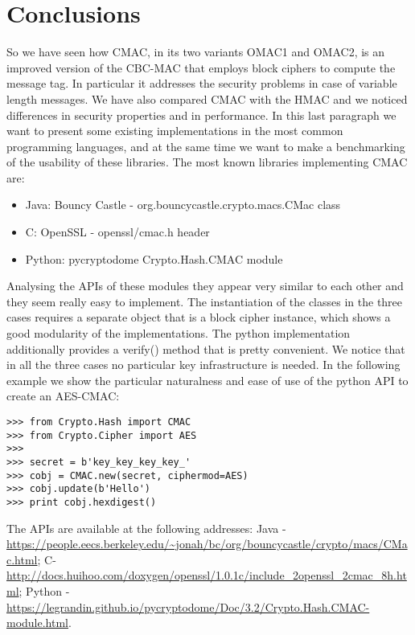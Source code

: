 \documentclass[11pt]{article}
\begin{document}
\section{Conclusions}
So we have seen how CMAC, in its two variants OMAC1 and OMAC2, is an improved version of the CBC-MAC that employs block ciphers to compute the message tag. In particular it addresses the security problems in case of variable length messages. We have also compared CMAC with the HMAC and we noticed differences in security properties and in performance.
In this last paragraph we want to present some existing implementations in the most common programming languages, and at the same time we want to make a benchmarking of the usability of these libraries.
The most known libraries implementing CMAC are:
\begin{itemize}
\item Java: Bouncy Castle - org.bouncycastle.crypto.macs.CMac class
\item C: OpenSSL - openssl/cmac.h header
\item Python: pycryptodome Crypto.Hash.CMAC module
\end{itemize}
Analysing the APIs of these modules they appear very similar to each other and they seem really easy to implement. The instantiation of the classes in the three cases requires a separate object that is a block cipher instance, which shows a good modularity of the implementations. The python implementation additionally provides a verify() method that is pretty convenient. We notice that in all the three cases no particular key infrastructure is needed. In the following example we show the particular naturalness and ease of use of the python API to create an AES-CMAC:

\begin{verbatim}
>>> from Crypto.Hash import CMAC
>>> from Crypto.Cipher import AES
>>>
>>> secret = b'key_key_key_key_'
>>> cobj = CMAC.new(secret, ciphermod=AES)
>>> cobj.update(b'Hello')
>>> print cobj.hexdigest()
\end{verbatim}

The APIs are available at the following addresses: Java - \url{https://people.eecs.berkeley.edu/~jonah/bc/org/bouncycastle/crypto/macs/CMac.html}; C- \url{http://docs.huihoo.com/doxygen/openssl/1.0.1c/include_2openssl_2cmac_8h.html}; Python - \url{https://legrandin.github.io/pycryptodome/Doc/3.2/Crypto.Hash.CMAC-module.html}.


\nocite{*} %
 

\end{document}
